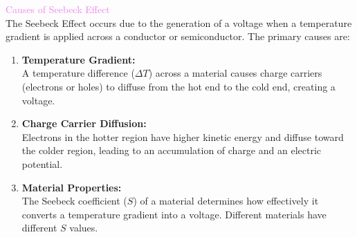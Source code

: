 \documentclass{beamer}
\begin{document}
\begin{frame}
\textcolor{violet}{Causes of Seebeck Effect}\\

The Seebeck Effect occurs due to the generation of a voltage when a temperature gradient is applied across a conductor or semiconductor. The primary causes are:

\begin{tcolorbox}[colback=yellow!10!white, colframe=yellow!50!black, title=Causes of the Seebeck Effect]
\begin{enumerate}
    \item \textbf{Temperature Gradient:} \\
    A temperature difference (\( \Delta T \)) across a material causes charge carriers (electrons or holes) to diffuse from the hot end to the cold end, creating a voltage.

    \item \textbf{Charge Carrier Diffusion:} \\
    Electrons in the hotter region have higher kinetic energy and diffuse toward the colder region, leading to an accumulation of charge and an electric potential.

    \item \textbf{Material Properties:} \\
    The Seebeck coefficient (\( S \)) of a material determines how effectively it converts a temperature gradient into a voltage. Different materials have different \( S \) values.
\end{enumerate}
\end{tcolorbox}
\end{frame}
\end{document}
